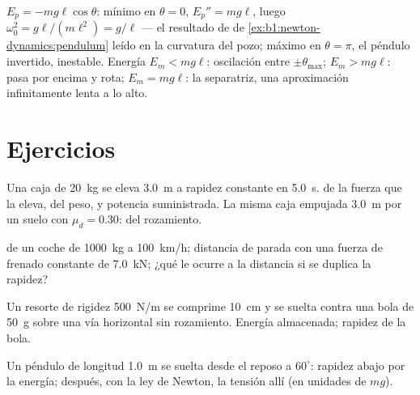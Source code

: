 \begin{example}\label{ex:b1:work-and-energy:pendulum}
$E_p = -mg\ell\cos\theta$: mínimo en $\theta = 0$, $E_p'' = mg\ell$, luego
$\omega_0^2 = g\ell/(m\ell^2) = g/\ell$ --- el resultado de  de \cref{ex:b1:newton-dynamics:pendulum} leído en la
curvatura del pozo; máximo en $\theta = \pi$, el péndulo invertido,
inestable. Energía $E_m < mg\ell$: oscilación entre $\pm\theta_{\max}$;
$E_m > mg\ell$: pasa por encima y rota; $E_m = mg\ell$: la separatriz, una
aproximación infinitamente lenta a lo alto.
\end{example}

\section{Ejercicios}

\begin{exercise}[$\star$]\label{exo:b1:work-and-energy:1}
Una caja de \qty{20}{kg} se eleva \qty{3.0}{m} a rapidez constante en
\qty{5.0}{s}.  de la fuerza que la eleva, del peso, y potencia
suministrada. La misma caja empujada \qty{3.0}{m} por un suelo con
$\mu_d = 0.30$:  del rozamiento.
\end{exercise}

\begin{exercise}[$\star$]\label{exo:b1:work-and-energy:2}
 de un coche de \qty{1000}{kg} a \qty{100}{km/h};
distancia de parada con una fuerza de frenado constante de \qty{7.0}{kN};
¿qué le ocurre a la distancia si se duplica la rapidez?
\end{exercise}

\begin{exercise}[$\star$]\label{exo:b1:work-and-energy:3}
Un resorte de rigidez \qty{500}{N/m} se comprime \qty{10}{cm} y se suelta
contra una bola de \qty{50}{g} sobre una vía horizontal sin rozamiento.
Energía almacenada; rapidez de la bola.
\end{exercise}

\begin{exercise}[$\star$]\label{exo:b1:work-and-energy:4}
Un péndulo de longitud \qty{1.0}{m} se suelta desde el reposo a
$60^\circ$: rapidez abajo por la energía; después, con la ley de Newton,
la tensión allí (en unidades de $mg$).
\end{exercise}


